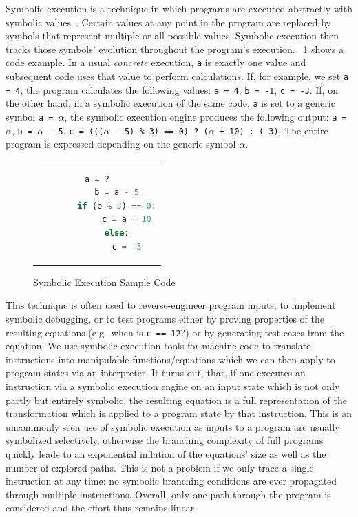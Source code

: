 Symbolic execution is a technique in which programs are executed abstractly with symbolic values~\cite{Steinhöfel2022}.
Certain values at any point in the program are replaced by symbols that represent multiple or all possible values.
Symbolic execution then tracks those symbols' evolution throughout the program's execution.
\lstlistingname~\ref{fig:symbexec_example_listing} shows a code example. In a usual \textit{concrete} execution,
\texttt{a} is exactly one value and subsequent code uses that value to perform calculations. If, for example, we set
\texttt{a = 4}, the program calculates the following values: \texttt{a = 4}, \texttt{b = -1}, \texttt{c = -3}. If, on
the other hand, in a symbolic execution of the same code, \texttt{a} is set to a generic symbol \texttt{a = $\alpha$},
the symbolic execution engine produces the following output: \texttt{a = $\alpha$}, \texttt{b = $\alpha$ - 5}, \texttt{c
= ((($\alpha$ - 5) \% 3) == 0) ? ($\alpha$ + 10) : (-3)}. The entire program is expressed depending on the generic
symbol $\alpha$.

\begin{figure}[htbp]
    \centering
    \begin{tabular}{c}
    \begin{lstlisting}[language=Python]
        a = ?
        b = a - 5
        if (b % 3) == 0:
            c = a + 10
        else:
            c = -3
    \end{lstlisting}
    \end{tabular}
    \caption[Symbolic execution example]{Symbolic Execution Sample Code}\label{fig:symbexec_example_listing}
\end{figure}


This technique is often used to reverse-engineer program inputs, to implement symbolic debugging, or to test programs
either by proving properties of the resulting equations (e.g.\ when is \texttt{c == 12}?) or by generating test cases
from the equation. We use symbolic execution tools for machine code to translate instructions into manipulable
functions/equations which we can then apply to program states via an interpreter. It turns out, that, if one executes an
instruction via a symbolic execution engine on an input state which is not only partly but entirely symbolic, the
resulting equation is a full representation of the transformation which is applied to a program state by that
instruction. This is an uncommonly seen use of symbolic execution as inputs to a program are usually symbolized
selectively, otherwise the branching complexity of full programs quickly leads to an exponential inflation of the
equations' size as well as the number of explored paths. This is not a problem if we only trace a single instruction at
any time: no symbolic branching conditions are ever propagated through multiple instructions. Overall, only one path
through the program is considered and the effort thus remains linear.

